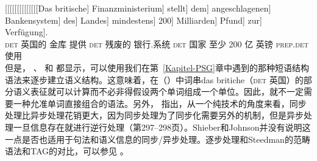 \ea
\gll {}[[[[[[[[[[[[[[Das britische] Finanzministerium] stellt] dem] angeschlagenen] Bankensystem] des] Landes] mindestens] 200] Milliarden] Pfund] zur]~~~~~~~~~ Verfügung].\\
{}\spacebr{}\spacebr{}\spacebr{}\spacebr{}\spacebr{}\spacebr{}\spacebr{}\spacebr{}\spacebr{}\spacebr{}\spacebr{}\spacebr{}\spacebr{}\spacebr{}\textsc{det} 英国的 金库 提供 \textsc{det}
残废的 银行.系统 \textsc{det} 国家 至少 200 亿 英镑 \textsc{prep}.\textsc{det} 使用\\
\z
但是， \citet{Pulman85a}、 \citet{Stabler91a}和 \citet[--308]{SJ93a}都显示，可以使用我们在第~\ref{Kapitel-PSG}章中遇到的那种短语结构语法来逐步建立语义结构。这意味着，在（）中词串das britiche（\textsc{det} 英国）的部分语义表征就可以计算而不必非得假设两个单词组成一个单位。因此，就不一定需要一种允准单词直接组合的语法。另外，  指出，从一个纯技术的角度来看，同步处理比异步处理花销更大，因为同步处理为了同步化需要另外的机制，但是异步处理一旦信息存在就进行逆行处理（第297--298页）。Shieber和Johnson并没有说明这一点是否也适用于句法和语义信息的同步/异步处理。逐步处理和Steedman的范畴语法\indexcgc 和TAG\indextagc 的对比，可以参见 。

